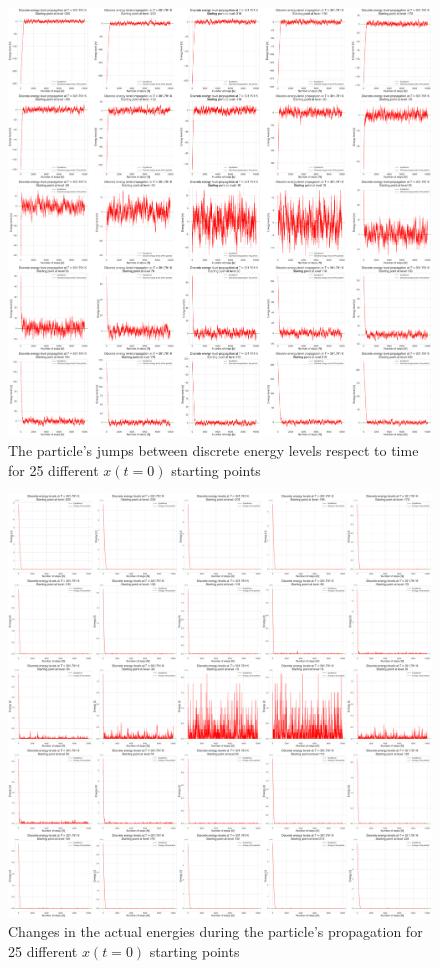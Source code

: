 \begin{figure}
    \centering
    \includegraphics[width=\textwidth]{images/discrete_levels_various_start.pdf}
    \caption{The particle's jumps between discrete energy levels respect to time for 25 different $x \left( t = 0 \right)$ starting points}
    \label{fig:fig3}
\end{figure}

\begin{figure}
    \centering
    \includegraphics[width=\textwidth]{images/discrete_energies_various_start.pdf}
    \caption{Changes in the actual energies during the particle's propagation for 25 different $x \left( t = 0 \right)$ starting points}
    \label{fig:fig4}
\end{figure}

